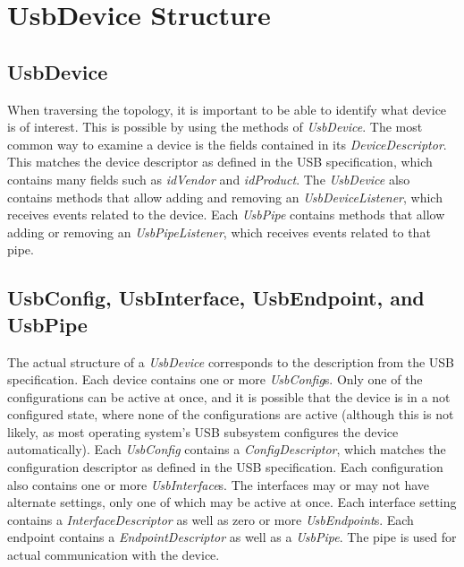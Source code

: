 \documentclass{article}
\newcommand{\myinterface}[1]{\emph{#1}}
\newcommand{\mymethod}[1]{\emph{#1}}
\newcommand{\mysectionend}[0]{\vfill\pagebreak[1]}
\begin{document}
\mysectionend

%

\section{UsbDevice Structure}

\subsection{UsbDevice}

When traversing the topology, it is important to be able to identify what device is
of interest.  This is possible by using the methods of \myinterface{UsbDevice}.  The most
common way to examine a device is the fields contained in its \myinterface{DeviceDescriptor}.
This matches the device descriptor as defined in the USB specification, which contains
many fields such as \mymethod{idVendor} and \mymethod{idProduct}.  The \myinterface{UsbDevice}
also contains methods that allow adding and removing an \myinterface{UsbDeviceListener},
which receives events related to the device.  Each \myinterface{UsbPipe} contains methods
that allow adding or removing an \myinterface{UsbPipeListener}, which receives events
related to that pipe.

\subsection{UsbConfig, UsbInterface, UsbEndpoint, and UsbPipe}

The actual structure of a \myinterface{UsbDevice} corresponds to the description from
the USB specification.  Each device contains one or more \myinterface{UsbConfig}s.
Only one of the configurations can be active at once, and it is possible that the device
is in a not configured state, where none of the configurations are active (although this
is not likely, as most operating system's USB subsystem configures the device automatically).
Each \myinterface{UsbConfig} contains a \myinterface{ConfigDescriptor}, which matches the
configuration descriptor as defined in the USB specification.  Each configuration
also contains one or more \myinterface{UsbInterface}s.  The interfaces may or may not have
alternate settings, only one of which may be active at once.  Each interface setting
contains a \myinterface{InterfaceDescriptor} as well as zero or more \myinterface{UsbEndpoint}s.
Each endpoint contains a \myinterface{EndpointDescriptor} as well as a \myinterface{UsbPipe}.
The pipe is used for actual communication with the device.
\end{document}
